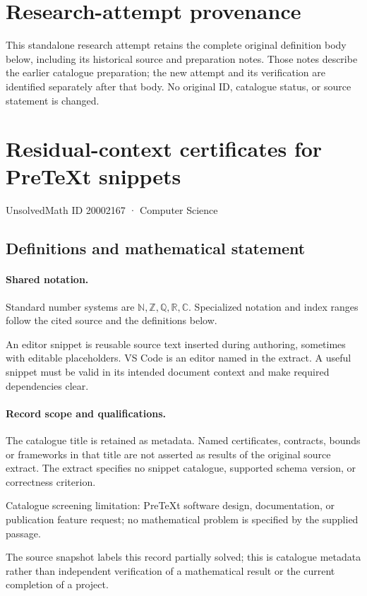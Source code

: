 \documentclass[11pt]{article}
\begin{document}
\section*{Research-attempt provenance}
This standalone research attempt retains the complete original definition body below,
including its historical source and preparation notes. Those notes describe the
earlier catalogue preparation; the new attempt and its verification are identified
separately after that body. No original ID, catalogue status, or source statement is changed.

\section{Residual-context certificates for PreTeXt snippets}\label{20002167}
{\small UnsolvedMath ID 20002167 · Computer Science}
\subsection{Definitions and mathematical statement}

\paragraph{Shared notation.}Standard number systems are $\mathbb N,\mathbb Z,\mathbb Q,\mathbb R,\mathbb C$. Specialized notation and index ranges follow the cited source and the definitions below.


An editor snippet is reusable source text inserted during authoring, sometimes with editable placeholders. VS Code is an editor named in the extract. A useful snippet must be valid in its intended document context and make required dependencies clear.
\paragraph{Record scope and qualifications.}
The catalogue title is retained as metadata. Named certificates, contracts, bounds or frameworks in that title are not asserted as results of the original source extract.
The extract specifies no snippet catalogue, supported schema version, or correctness criterion.

Catalogue screening limitation: PreTeXt software design, documentation, or publication feature request; no mathematical problem is specified by the supplied passage.

The source snapshot labels this record partially solved; this is catalogue metadata rather than independent verification of a mathematical result or the current completion of a project.
\end{document}
